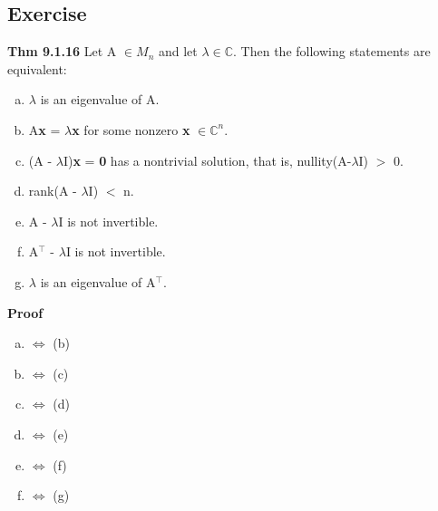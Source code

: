 \documentclass[12pt, letterpaper]{article}
\begin{document}
\subsection{Exercise}
\textbf{Thm 9.1.16} Let A $\in M_n$ and let $\lambda \in \mathbb{C}$. Then the following statements are equivalent:
\begin{enumerate}[(a)]
    \item $\lambda$ is an eigenvalue of A.
    \item A\textbf{x} = $\lambda$\textbf{x} for some nonzero \textbf{x} $\in \mathbb{C}^n$.
    \item (A - $\lambda$I)\textbf{x} = \textbf{0} has a nontrivial solution, that is, nullity(A-$\lambda$I) $>$ 0.
    \item rank(A - $\lambda$I) $<$ n.
    \item A - $\lambda$I is not invertible.
    \item A$^\top$ - $\lambda$I is not invertible.
    \item $\lambda$ is an eigenvalue of A$^\top$.
\end{enumerate}
\textbf{Proof}
\begin{enumerate}[(a)]
    \item $\Leftrightarrow$ (b)
    \item $\Leftrightarrow$ (c)
    \item $\Leftrightarrow$ (d)
    \item $\Leftrightarrow$ (e)
    \item $\Leftrightarrow$ (f)
    \item $\Leftrightarrow$ (g)
\end{enumerate}
\end{document}

